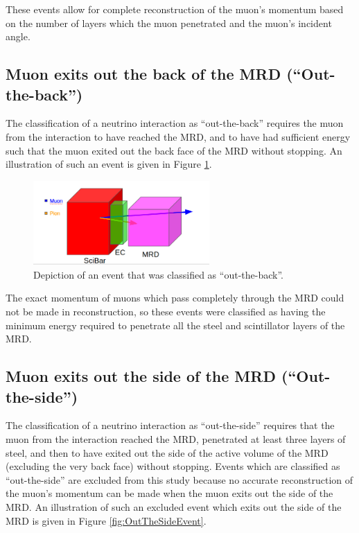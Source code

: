 \documentclass[11pt]{article}
\begin{document}
These events allow for complete reconstruction of the muon's momentum based on the number of layers which the muon penetrated and the muon's incident angle.

\subsection{Muon exits out the back of the MRD (``Out-the-back'')}
\label{sub:outback}
The classification of a neutrino interaction as ``out-the-back'' requires the muon from the interaction to have reached the MRD, and to have had sufficient energy such that the muon exited out the back face of the MRD without stopping. An illustration of such an event is given in Figure \ref*{fig:NotStoppedEvent}. 

\begin{figure}[H]
\centering
\includegraphics[width=0.6\textwidth]{EventClassifications/OutTheBack.png}
\caption{Depiction of an event that was classified as ``out-the-back''.}
\label{fig:NotStoppedEvent}
\end{figure}

The exact momentum of muons which pass completely through the MRD could not be made in reconstruction, so these events were classified as having the minimum energy required to penetrate all the steel and scintillator layers of the MRD.

\subsection{Muon exits out the side of the MRD (``Out-the-side'')}
\label{sub:outside}
The classification of a neutrino interaction as ``out-the-side'' requires that the muon from the interaction reached the MRD, penetrated at least three layers of steel, and then to have exited out the side of the active volume of the MRD (excluding the very back face) without stopping. Events which are classified as ``out-the-side'' are excluded from this study because no accurate reconstruction of the muon's momentum can be made when the muon exits out the side of the MRD. An illustration of such an excluded event which exits out the side of the MRD is given in Figure \ref*{fig:OutTheSideEvent}.
\end{document}
